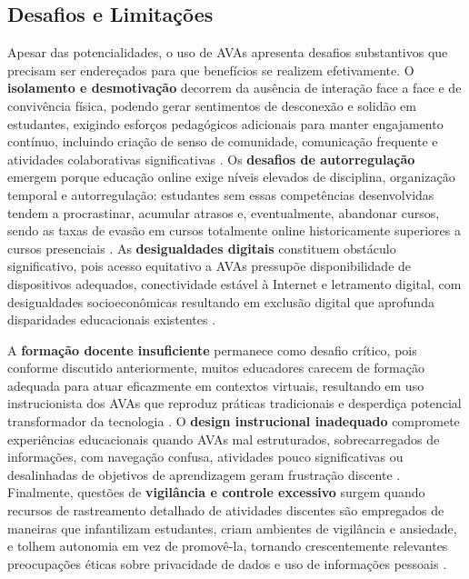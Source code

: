 \documentclass[portuguese]{sbc2025}%
\begin{document}
\subsection{Desafios e Limitações}

Apesar das potencialidades, o uso de AVAs apresenta desafios substantivos que precisam ser endereçados para que benefícios se realizem efetivamente. O \textbf{isolamento e desmotivação} decorrem da ausência de interação face a face e de convivência física, podendo gerar sentimentos de desconexão e solidão em estudantes, exigindo esforços pedagógicos adicionais para manter engajamento contínuo, incluindo criação de senso de comunidade, comunicação frequente e atividades colaborativas significativas \cite{Garrison2016, Anderson2003}. Os \textbf{desafios de autorregulação} emergem porque educação online exige níveis elevados de disciplina, organização temporal e autorregulação: estudantes sem essas competências desenvolvidas tendem a procrastinar, acumular atrasos e, eventualmente, abandonar cursos, sendo as taxas de evasão em cursos totalmente online historicamente superiores a cursos presenciais \cite{Hodges2020}. As \textbf{desigualdades digitais} constituem obstáculo significativo, pois acesso equitativo a AVAs pressupõe disponibilidade de dispositivos adequados, conectividade estável à Internet e letramento digital, com desigualdades socioeconômicas resultando em exclusão digital que aprofunda disparidades educacionais existentes \cite{Williamson2020, UNESCO2022}.

A \textbf{formação docente insuficiente} permanece como desafio crítico, pois conforme discutido anteriormente, muitos educadores carecem de formação adequada para atuar eficazmente em contextos virtuais, resultando em uso instrucionista dos AVAs que reproduz práticas tradicionais e desperdiça potencial transformador da tecnologia \cite{Koehler2009, Mishra2006}. O \textbf{design instrucional inadequado} compromete experiências educacionais quando AVAs mal estruturados, sobrecarregados de informações, com navegação confusa, atividades pouco significativas ou desalinhadas de objetivos de aprendizagem geram frustração discente \cite{Bates2015}. Finalmente, questões de \textbf{vigilância e controle excessivo} surgem quando recursos de rastreamento detalhado de atividades discentes são empregados de maneiras que infantilizam estudantes, criam ambientes de vigilância e ansiedade, e tolhem autonomia em vez de promovê-la, tornando crescentemente relevantes preocupações éticas sobre privacidade de dados e uso de informações pessoais \cite{Williamson2020}.
\end{document}
